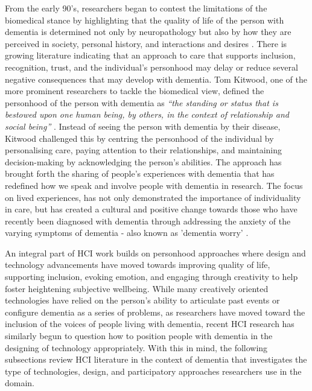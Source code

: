 From the early 90's, researchers began to contest the limitations of the biomedical stance by highlighting that the quality of life of the person with dementia is determined not only by neuropathology but also by how they are perceived in society, personal history, and interactions and desires \citep{o2007personhood}. There is growing literature indicating that an approach to care that supports inclusion, recognition, trust, and the individual's personhood may delay or reduce several negative consequences that may develop with dementia. Tom Kitwood, one of the more prominent researchers to tackle the biomedical view, defined the personhood of the person with dementia as \textit{``the standing or status that is bestowed upon one human being, by others, in the context of relationship and social being''} \citep[pg.8]{kitwood1997dementia}. Instead of seeing the person with dementia by their disease, Kitwood challenged this by centring the personhood of the individual by personalising care, paying attention to their relationships, and maintaining decision-making by acknowledging the person's abilities. The approach has brought forth the sharing of people's experiences with dementia that has redefined how we speak and involve people with dementia in research. The focus on lived experiences, has not only demonstrated the importance of individuality in care, but has created a cultural and positive change towards those who have recently been diagnosed with dementia through addressing the anxiety of the varying symptoms of dementia - also known as 'dementia worry' \citep{kessler_dementia_2012}.

An integral part of HCI work builds on personhood approaches where design and technology advancements have moved towards improving quality of life, supporting inclusion, evoking emotion, and engaging through creativity to help foster heightening subjective wellbeing. While many creatively oriented technologies have relied on the person's ability to articulate past events or configure dementia as a series of problems, as researchers have moved toward the inclusion of the voices of people living with dementia, recent HCI research has similarly begun to question how to position people with dementia in the designing of technology appropriately. With this in mind, the following subsections review HCI literature in the context of dementia that investigates the type of technologies, design, and participatory approaches researchers use in the domain.

